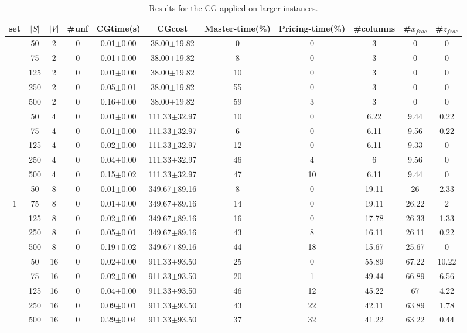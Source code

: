 \documentclass{llncs}
\begin{document}
\begin{table}[h]
\begin{center}
  \caption{Results for the CG applied on larger instances. \label{tab:full}}
  \begin{tabular}{c c c c c c  c c c c c}
set & $|S|$ & $|V$| & \#unf  &  CGtime(s)  &  CGcost   &  Master-time(\%)  &  Pricing-time(\%)  &  \#columns  &  \#$x_{frac}$  &  \#$z_{frac}$ \\
\hline
&50&2&0&  0.01$\pm$0.00  &  38.00$\pm$19.82    &0&0&3&0&0\\
&75&2&0&  0.01$\pm$0.00  &  38.00$\pm$19.82    &8&0&3&0&0\\
&125&2&0&  0.01$\pm$0.00  &  38.00$\pm$19.82    &10&0&3&0&0\\
&250&2&0&  0.05$\pm$0.01  &  38.00$\pm$19.82    &55&0&3&0&0\\
&500&2&0&  0.16$\pm$0.00  &  38.00$\pm$19.82    &59&3&3&0&0\\
&50&4&0&  0.01$\pm$0.00  &  111.33$\pm$32.97   &10&0&6.22&9.44&0.22\\
&75&4&0&  0.01$\pm$0.00  &  111.33$\pm$32.97   &6&0&6.11&9.56&0.22\\
&125&4&0&  0.02$\pm$0.00  &  111.33$\pm$32.97   &12&0&6.11&9.33&0\\
&250&4&0&  0.04$\pm$0.00  &  111.33$\pm$32.97   &46&4&6&9.56&0\\
&500&4&0&  0.15$\pm$0.02  &  111.33$\pm$32.97   &47&10&6.11&9.44&0\\
&50&8&0&  0.01$\pm$0.00  &  349.67$\pm$89.16   &8&0&19.11&26&2.33\\
1&75&8&0&  0.01$\pm$0.00  &  349.67$\pm$89.16   &14&0&19.11&26.22&2\\
&125&8&0&  0.02$\pm$0.00  &  349.67$\pm$89.16   &16&0&17.78&26.33&1.33\\
&250&8&0&  0.05$\pm$0.01  &  349.67$\pm$89.16   &43&8&16.11&26.11&0.22\\
&500&8&0&  0.19$\pm$0.02  &  349.67$\pm$89.16   &44&18&15.67&25.67&0\\
&50&16&0&  0.02$\pm$0.00  &  911.33$\pm$93.50   &25&0&55.89&67.22&10.22\\
&75&16&0&  0.02$\pm$0.00  &  911.33$\pm$93.50   &20&1&49.44&66.89&6.56\\
&125&16&0&  0.04$\pm$0.00  &  911.33$\pm$93.50   &46&12&45.22&67&4.22\\
&250&16&0&  0.09$\pm$0.01  &  911.33$\pm$93.50   &43&22&42.11&63.89&1.78\\
&500&16&0&  0.29$\pm$0.04  &  911.33$\pm$93.50   &37&32&41.22&63.22&0.44\\

\end{tabular}
\end{center}
\end{table}
\end{document}
